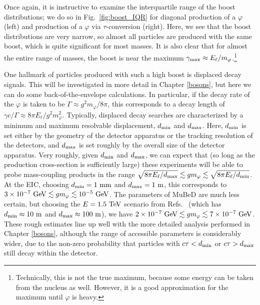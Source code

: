 Once again, it is instructive to examine the interquartile range of the boost distributions; we do so in Fig.~\ref{fig:boost_IQR} for diagonal production of a $\varphi$ (left) and production of a $\varphi$ via $\tau$-conversion (right). Here, we see that the boost distributions are very narrow, so almost all particles are produced with the same boost, which is quite significant for most masses. It is also clear that for almost the entire range of masses, the boost is near the maximum $\gamma_{\rm max} \approx E_\ell/m_\varphi$.\footnote{Technically, this is not the true maximum, because some energy can be taken from the nucleus as well. However, it is a good approximation for the maximum until $\varphi$ is heavy. } 

One hallmark of particles produced with such a high boost is displaced decay signals. This will be investigated in more detail in Chapter \ref{bosons}, but here we can do some back-of-the-envelope calculations. In particular, if the decay rate of the $\varphi$ is taken to be $\Gamma \approx g^2 m_\varphi / 8\pi$, this corresponds to a decay length of $\gamma c/\Gamma \approx 8\pi E_\ell / g^2 m_\varphi^2$. Typically, displaced decay searches are characterized by a minimum and maximum resolvable displacement, $d_{\rm min}$ and $d_{\rm max}$. Here, $d_{\rm min}$ is set either by the geometry of the detector apparatus or the tracking resolution of the detectors, and $d_{\rm max}$ is set roughly by the overall size of the detector apparatus. Very roughly, given $d_{\rm min}$ and $d_{\rm max}$, we can expect that (so long as the production cross-section is sufficiently large) these experiments will be able to probe mass-coupling products in the range $\sqrt{8\pi E_\ell/d_{\rm max}} \lesssim g m_\varphi \lesssim \sqrt{8\pi E_\ell/d_{\rm min}}$. At the EIC, choosing $d_{\rm min} = 1~{\rm mm}$ and $d_{\rm max} = 1~{\rm m}$, this corresponds to $3\times 10^{-7}~{\rm GeV}\lesssim g m_\varphi \lesssim 10^{-5}~{\rm GeV}$. The parameters of MuBeD are much less certain, but choosing the $E = 1.5~{\rm TeV}$ scenario from Refs.~\cite{Cesarotti:2022ttv,Cesarotti:2023sje} (which has $d_{\rm min} \approx 10~{\rm m}$ and $d_{\rm max}\approx 100~{\rm m}$), we have $2\times 10^{-7}~{\rm GeV}\lesssim g m_\varphi \lesssim 7\times 10^{-7}~{\rm GeV}$. These rough estimates line up well with the more detailed analysis performed in Chapter \ref{bosons}, although the range of accessible parameters is considerably wider, due to the non-zero probability that particles with $c\tau < d_{\rm min}$ or $c\tau > d_{\rm max}$ still decay within the detector.


